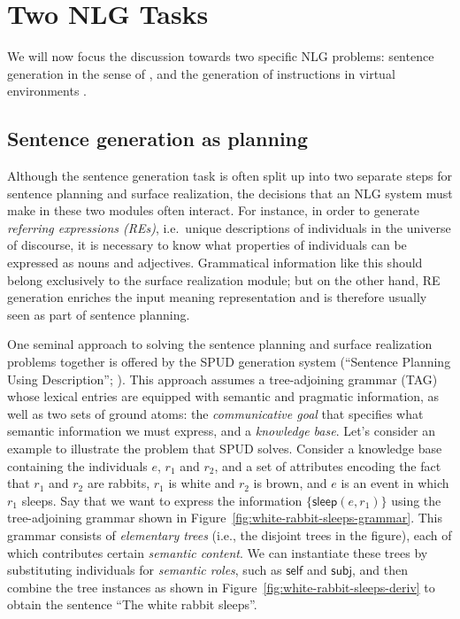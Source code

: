\section{Two NLG Tasks}
\label{sec:domains}

We will now focus the discussion towards two specific NLG problems:
sentence generation in the sense of \cite{KolSto07}, and the
generation of instructions in virtual environments
\cite{ByrKolStrCasDalMooObe09}. 


\subsection{Sentence generation as planning}

Although the sentence generation task is often split up into two
separate steps for sentence planning and surface realization, the
decisions that an NLG system must make in these two modules often
interact. For instance, in order to generate \emph{referring
  expressions (REs)}, i.e.\ unique descriptions of individuals in the
universe of discourse, it is necessary to know what properties of
individuals can be expressed as nouns and adjectives. Grammatical
information like this should belong exclusively to the surface
realization module; but on the other hand, RE generation enriches the
input meaning representation and is therefore usually seen as part of
sentence planning.

One seminal approach to solving the sentence planning and surface
realization problems together is offered by the SPUD generation system
(``Sentence Planning Using Description''; \citealt{Stone2003a}). This
approach assumes a tree-adjoining grammar (TAG) \citep{joshi;etal1997}
whose lexical entries are equipped with semantic and pragmatic
information, as well as two sets of ground atoms: the
\emph{communicative goal} that specifies what semantic information we
must express, and a \emph{knowledge base}. Let's consider an example
to illustrate the problem that SPUD solves. Consider a knowledge base
containing the individuals $e$, $r_1$ and $r_2$, and a set of
attributes encoding the fact that $r_1$ and $r_2$ are rabbits, $r_1$
is white and $r_2$ is brown, and $e$ is an event in which $r_1$
sleeps.  Say that we want to express the information
$\{\mathsf{sleep}(e,r_1)\}$ using the tree-adjoining grammar shown in
Figure~\ref{fig:white-rabbit-sleeps-grammar}. This grammar consists of
\emph{elementary trees} (i.e., the disjoint trees in the figure), each
of which contributes certain \emph{semantic content}. We can
instantiate these trees by substituting individuals for \emph{semantic
  roles}, such as $\mathsf{self}$ and $\mathsf{subj}$, and then
combine the tree instances as shown in
Figure~\ref{fig:white-rabbit-sleeps-deriv} to obtain the sentence
``The white rabbit sleeps''.

